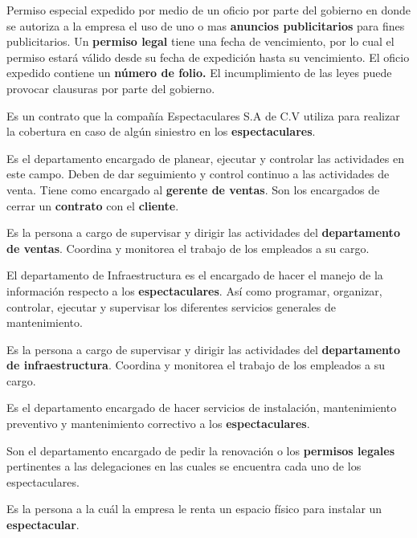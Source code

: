 \begin{description}[style=nextline]
\item[Permiso legal]
Permiso especial expedido por medio de un oficio por parte del gobierno en donde se autoriza a la empresa el uso de uno o mas \textbf{anuncios publicitarios} para fines publicitarios. Un \textbf{permiso legal} tiene una fecha de vencimiento, por lo cual el permiso estará válido desde su fecha de expedición hasta su vencimiento. El oficio expedido contiene un \textbf{número de folio.} El incumplimiento de las leyes puede provocar clausuras por parte del gobierno. 

\item[Seguro]
Es un contrato que la compañía Espectaculares S.A de C.V utiliza para realizar la cobertura en caso de algún siniestro en los \textbf{espectaculares}.

\item[Departamento de Ventas]
Es el departamento encargado de planear, ejecutar y controlar las actividades en este campo. Deben de dar seguimiento y control continuo a las actividades de venta.
Tiene como encargado al \textbf{gerente de ventas}. Son los encargados de cerrar un \textbf{contrato} con el \textbf{cliente}.

\item[Gerente de Ventas]
Es la persona a cargo de supervisar y dirigir las actividades del \textbf{departamento de ventas}. Coordina y monitorea el trabajo de los empleados a su cargo.

\item[Departamento de Infraestructura]
El departamento de Infraestructura es el encargado de hacer el manejo de la información respecto a los \textbf{espectaculares}. Así como programar, organizar, controlar, ejecutar y supervisar los diferentes servicios generales de mantenimiento. 

\item[Gerente de Infraestructura]
Es la persona a cargo de supervisar y dirigir las actividades del \textbf{departamento de infraestructura}. Coordina y monitorea el trabajo de los empleados a su cargo.

\item[Departamento de Instalación y Mantenimiento]
Es el departamento encargado de hacer servicios de instalación, mantenimiento preventivo y mantenimiento correctivo a los \textbf{espectaculares}.

\item[Departamento Jurídico]
Son el departamento encargado de pedir la renovación o los \textbf{permisos legales} pertinentes a las delegaciones en las cuales se encuentra cada uno de los espectaculares. 
\item[Arrendador]
Es la persona a la cuál la empresa le renta un espacio físico para instalar un \textbf{espectacular}.


\end{description}
